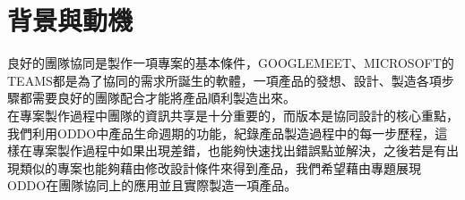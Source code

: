 \chapter{背景與動機}
\renewcommand{\baselinestretch}{10.0} %




\fontsize{14pt}{2.5pt}\sectionef\hspace{12pt}
良好的團隊協同是製作一項專案的基本條件，GOOGLEMEET、MICROSOFT的TEAMS都是為了協同的需求所誕生的軟體，一項產品的發想、設計、製造各項步驟都需要良好的團隊配合才能將產品順利製造出來。\\[14pt]

\fontsize{14pt}{2.5pt}\sectionef\hspace{12pt} 在專案製作過程中團隊的資訊共享是十分重要的，而版本是協同設計的核心重點，我們利用ODDO中產品生命週期的功能，紀錄產品製造過程中的每一步歷程，這樣在專案製作過程中如果出現差錯，也能夠快速找出錯誤點並解決，之後若是有出現類似的專案也能夠藉由修改設計條件來得到產品，我們希望藉由專題展現ODDO在團隊協同上的應用並且實際製造一項產品。\\[12pt]


\newpage

\renewcommand{\baselinestretch}{0.5} %